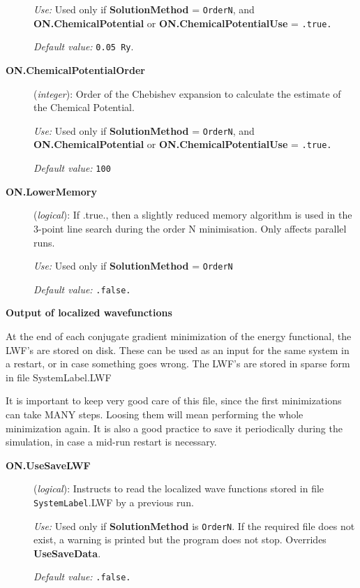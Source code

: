 \begin{description}
\textit{Use:} Used only if \textbf{SolutionMethod} = \texttt{OrderN},
and \textbf{ON.ChemicalPotential} or  \textbf{ON.ChemicalPotentialUse} =
\texttt{.true.}

\textit{Default value:} \texttt{0.05 Ry}.

\item[\textbf{ON.ChemicalPotentialOrder}] (\textit{integer}):
Order of the Chebishev expansion to calculate the estimate
of the Chemical Potential.

\textit{Use:} Used only if \textbf{SolutionMethod} = \texttt{OrderN},
and \textbf{ON.ChemicalPotential} or  \textbf{ON.ChemicalPotentialUse} =
\texttt{.true.}

\textit{Default value:} \texttt{100}

\item[\textbf{ON.LowerMemory}] (\textit{logical}):
If .true., then a slightly reduced memory algorithm is used in the
3-point line search during the order N minimisation. Only affects
parallel runs.

\textit{Use:} Used only if  \textbf{SolutionMethod} = \texttt{OrderN}

\textit{Default value:} \texttt{.false.}


\end{description}

\textbf{Output of localized wavefunctions}

At the end of each conjugate gradient minimization of the energy
functional, the LWF's are stored on disk. These can be used as an
input for the same system in a restart, or in case something goes
wrong.  The LWF's are stored in sparse form in file SystemLabel.LWF

It is important to keep very good care of this file, since the first
minimizations can take MANY steps. Loosing them will mean performing
the whole minimization again. It is also a good practice to save it
periodically during the simulation, in case a mid-run restart is
necessary.

\begin{description}

\item[\textbf{ON.UseSaveLWF}] (\textit{logical}):
Instructs to read the localized wave functions stored in file
\texttt{SystemLabel}.LWF by a previous run.

\textit{Use:} Used only if \textbf{SolutionMethod} is \texttt{OrderN}.
If the required file does not exist, a warning is
printed but the program does not stop. Overrides \textbf{UseSaveData}.

\textit{Default value:} \texttt{.false.}

\end{description}

